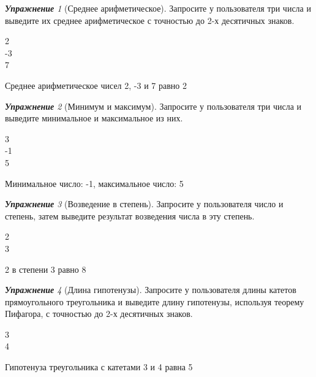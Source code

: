 \documentclass[a4,12pt]{article}
\theoremstyle{remark}
\newtheorem{exercise}{\textbf{Упражнение}}[section]
\begin{document}
\begin{exercise}[Среднее арифметическое]
Запросите у пользователя три числа и выведите их среднее арифметическое с точностью до 2-х десятичных знаков.

\begin{inputformat}
2\\
-3\\
7
\end{inputformat}

\begin{outputformat}
Среднее арифметическое чисел 2, -3 и 7 равно 2
\end{outputformat}
\end{exercise}

\pagebreak

\begin{exercise}[Минимум и максимум]
Запросите у пользователя три числа и выведите минимальное и максимальное из них.

\begin{inputformat}
3\\
-1\\
5
\end{inputformat}

\begin{outputformat}
Минимальное число: -1, максимальное число: 5
\end{outputformat}
\end{exercise}

\begin{exercise}[Возведение в степень]
Запросите у пользователя число и степень, затем выведите результат возведения числа в эту степень. 

\begin{inputformat}
2\\
3
\end{inputformat}

\begin{outputformat}
2 в степени 3 равно 8
\end{outputformat}
\end{exercise}

\begin{exercise}[Длина гипотенузы]
Запросите у пользователя длины катетов прямоугольного треугольника и выведите длину гипотенузы, используя теорему Пифагора, с точностью до 2-х десятичных знаков.

\begin{inputformat}
3\\
4
\end{inputformat}

\begin{outputformat}
Гипотенуза треугольника с катетами 3 и 4 равна 5
\end{outputformat}
\end{exercise}
\end{document}
